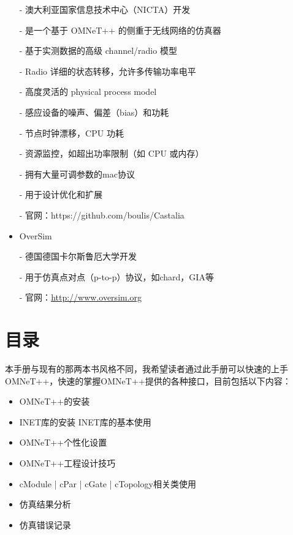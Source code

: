 \begin{itemize}
- 澳大利亚国家信息技术中心（NICTA）开发

- 是一个基于 OMNeT++ 的侧重于无线网络的仿真器

- 基于实测数据的高级 channel/radio 模型

- Radio 详细的状态转移，允许多传输功率电平

- 高度灵活的 physical process model

- 感应设备的噪声、偏差（bias）和功耗

- 节点时钟漂移，CPU 功耗

- 资源监控，如超出功率限制（如 CPU 或内存）

- 拥有大量可调参数的mac协议

- 用于设计优化和扩展

- 官网：https://github.com/boulis/Castalia


\item OverSim

- 德国德国卡尔斯鲁厄大学开发

- 用于仿真点对点（p-to-p）协议，如chard，GIA等

- 官网：\url{http://www.oversim.org} \\

\end{itemize}





\section{目录}

本手册与现有的那两本书风格不同，我希望读者通过此手册可以快速的上手OMNeT++，快速的掌握OMNeT++提供的各种接口，目前包括以下内容：

\begin{itemize}
	\item OMNeT++的安装
	\item INET库的安装 INET库的基本使用
	\item OMNeT++个性化设置
	\item OMNeT++工程设计技巧
	\item cModule | cPar | cGate | cTopology相关类使用
	\item 仿真结果分析
	\item 仿真错误记录
\end{itemize}



